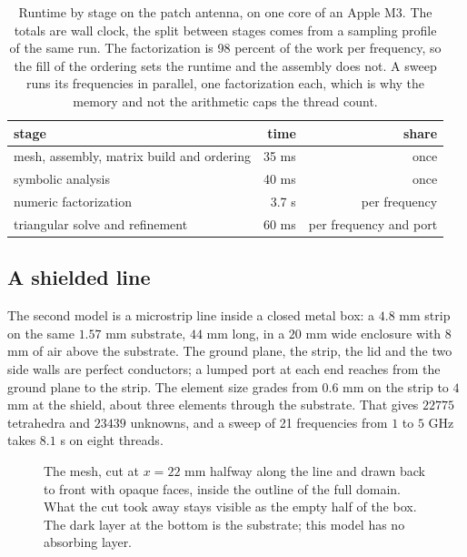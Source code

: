 \documentclass[11pt]{article}
\begin{document}
\begin{table}[H]
\centering
\begin{tabular}{lrr}
\toprule
stage & time & share \\
\midrule
mesh, assembly, matrix build and ordering & 35 ms & once \\
symbolic analysis & 40 ms & once \\
numeric factorization & 3.7 s & per frequency \\
triangular solve and refinement & 60 ms & per frequency and port \\
\bottomrule
\end{tabular}
\caption{Runtime by stage on the patch antenna, on one core of an Apple M3.
The totals are wall clock, the split between stages comes from a sampling
profile of the same run. The factorization is 98 percent of the work per
frequency, so the fill of the ordering sets the runtime and the assembly does
not. A sweep runs its frequencies in parallel, one factorization each, which
is why the memory and not the arithmetic caps the thread count.}
\label{tab:time}
\end{table}

\subsection{A shielded line}

The second model is a microstrip line inside a closed metal box: a
\(4.8\) mm strip on the same \(1.57\) mm substrate, \(44\) mm long, in
a \(20\) mm wide enclosure with \(8\) mm of air above the substrate. The
ground plane, the strip, the lid and the two side walls are perfect
conductors; a lumped port at each end reaches from the ground plane to the
strip. The element size grades from \(0.6\) mm on the strip to \(4\) mm
at the shield, about three elements through the substrate. That gives
\(22775\) tetrahedra and \(23439\) unknowns, and a sweep of 21
frequencies from \(1\) to \(5\) GHz takes \(8.1\) s on eight
threads.

\begin{figure}[H]
\centering
\begin{tikzpicture}

\end{tikzpicture}
\caption{The mesh, cut at \(x = 22\) mm halfway along the line and drawn back
to front with opaque faces, inside the outline of the full domain. What the
cut took away stays visible as the empty half of the box. The dark layer at
the bottom is the substrate; this model has no absorbing layer.}
\label{fig:linemesh}
\end{figure}
\end{document}
